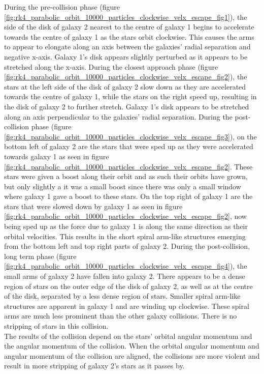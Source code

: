 \documentclass[10pt,letterpaper]{article}
\begin{document}
During the pre-collision phase (figure \ref{fig:rk4_parabolic_orbit_10000_particles_clockwise_velx_escape_fig1}), the side of the disk of galaxy 2 nearest to the centre of galaxy 1 begins to accelerate towards the centre of galaxy 1 as the stars orbit clockwise. This causes the arms to appear to elongate along an axis between the galaxies' radial separation and negative x-axis. Galaxy 1's disk appears slightly perturbed as it appears to be stretched along the x-axis. During the closest approach phase (figure \ref{fig:rk4_parabolic_orbit_10000_particles_clockwise_velx_escape_fig2}),  the stars at the left side of the disk of galaxy 2 slow down as they are accelerated towards the centre of galaxy 1, while the stars on the right speed up, resulting in the disk of galaxy 2 to further stretch. Galaxy 1's disk appears to be stretched along an axis perpendicular to the galaxies' radial separation. During the post-collision phase (figure \ref{fig:rk4_parabolic_orbit_10000_particles_clockwise_velx_escape_fig3}), on the bottom left of galaxy 2 are the stars that were sped up as they were accelerated towards galaxy 1 as seen in figure \ref{fig:rk4_parabolic_orbit_10000_particles_clockwise_velx_escape_fig2}. These stars were given a boost along their orbit and as such their orbits have grown, but only slightly a it was a small boost since there was only a small window where galaxy 1 gave a boost to these stars. On the top right of galaxy 1 are the stars that were slowed down by galaxy 1 as seen in figure \ref{fig:rk4_parabolic_orbit_10000_particles_clockwise_velx_escape_fig2}, now being sped up as the force due to galaxy 1 is along the same direction as their orbital velocities. This results in the short spiral arm-like structures emerging from the bottom left and top right parts of galaxy 2. During the post-collision, long term phase (figure \ref{fig:rk4_parabolic_orbit_10000_particles_clockwise_velx_escape_fig4}), the small arms of galaxy 2 have fallen into galaxy 2. There appears to be a dense region of stars on the outer edge of the disk of galaxy 2, as well as at the centre of the disk, separated by a less dense region of stars. Smaller spiral arm-like structures are apparent in galaxy 1 and are winding up clockwise. These spiral arms are much less prominent than the other galaxy collisions. There is no stripping of stars in this collision.\\

The results of the collision depend on the stars' orbital angular momentum and the angular momentum of the collision. When the orbital angular momentum and angular momentum of the collision are aligned, the collisions are more violent and result in more stripping of galaxy 2's stars as it passes by.\\
\pagebreak
\end{document}
